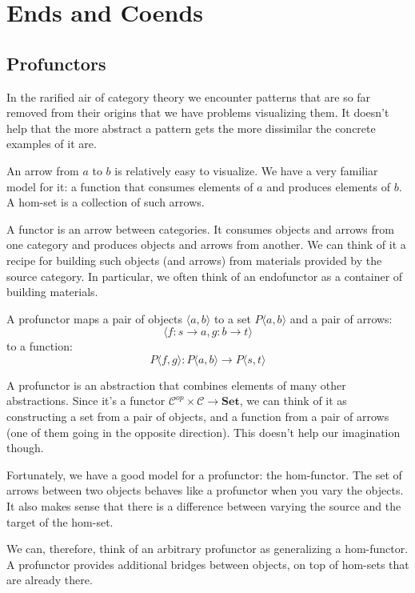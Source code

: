 \documentclass[DaoFP]{subfiles}
\begin{document}
\setcounter{chapter}{16}

\chapter{Ends and Coends}

\section{Profunctors}

In the rarified air of category theory we encounter patterns that are so far removed from their origins that we have problems visualizing them. It doesn't help that the more abstract a pattern gets the more dissimilar the concrete examples of it are. 

An arrow from $a$ to $b$ is relatively easy to visualize. We have a very familiar model for it: a function that consumes elements of $a$ and produces elements of $b$. A hom-set is a collection of such arrows. 

A functor is an arrow between categories. It consumes objects and arrows from one category and produces objects and arrows from another. We can think of it a recipe for building such objects (and arrows) from materials provided by the source category. In particular, we  often think of an endofunctor as a container of building materials.

A profunctor maps a pair of objects $\langle a, b \rangle$ to a set $P\langle a, b \rangle$ and a pair of arrows:
\[ \langle f \colon s \to a, g \colon b \to t \rangle \]
to a function:
\[ P\langle f, g \rangle \colon P\langle a, b \rangle \to P\langle s, t \rangle\]

A profunctor is an abstraction that combines elements of many other abstractions. Since it's a functor $ \mathcal{C}^{op} \times  \mathcal{C} \to \mathbf{Set}$, we can think of it as constructing a set from a pair of objects, and a function from a pair of arrows (one of them going in the opposite direction). This doesn't help our imagination though.

Fortunately, we have a good model for a profunctor: the hom-functor. The set of arrows between two objects behaves like a profunctor when you vary the objects. It also makes sense that there is a difference between varying the source and the target of the hom-set. 

We can, therefore, think of an arbitrary profunctor as generalizing a hom-functor. A profunctor provides additional bridges between objects, on top of hom-sets that are already there. 
\end{document}
